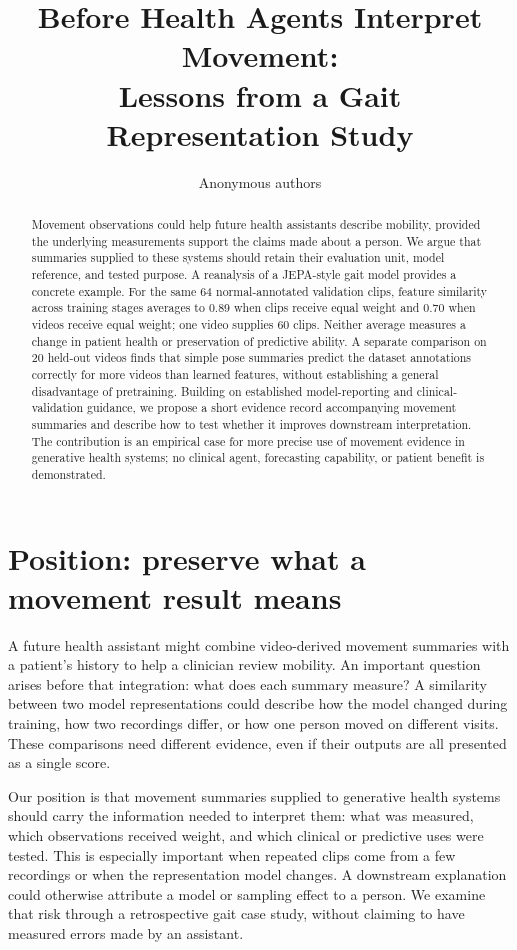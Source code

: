 \documentclass{article}
\title{Before Health Agents Interpret Movement:\\Lessons from a Gait Representation Study}
\author{Anonymous authors}
\begin{document}
\maketitle

\begin{abstract}
Movement observations could help future health assistants describe mobility, provided the underlying measurements support the claims made about a person. We argue that summaries supplied to these systems should retain their evaluation unit, model reference, and tested purpose. A reanalysis of a JEPA-style gait model provides a concrete example. For the same 64 normal-annotated validation clips, feature similarity across training stages averages to 0.89 when clips receive equal weight and 0.70 when videos receive equal weight; one video supplies 60 clips. Neither average measures a change in patient health or preservation of predictive ability. A separate comparison on 20 held-out videos finds that simple pose summaries predict the dataset annotations correctly for more videos than learned features, without establishing a general disadvantage of pretraining. Building on established model-reporting and clinical-validation guidance, we propose a short evidence record accompanying movement summaries and describe how to test whether it improves downstream interpretation. The contribution is an empirical case for more precise use of movement evidence in generative health systems; no clinical agent, forecasting capability, or patient benefit is demonstrated.
\end{abstract}

\section{Position: preserve what a movement result means}

A future health assistant might combine video-derived movement summaries with a patient's history to help a clinician review mobility. An important question arises before that integration: what does each summary measure? A similarity between two model representations could describe how the model changed during training, how two recordings differ, or how one person moved on different visits. These comparisons need different evidence, even if their outputs are all presented as a single score.

Our position is that movement summaries supplied to generative health systems should carry the information needed to interpret them: what was measured, which observations received weight, and which clinical or predictive uses were tested. This is especially important when repeated clips come from a few recordings or when the representation model changes. A downstream explanation could otherwise attribute a model or sampling effect to a person. We examine that risk through a retrospective gait case study, without claiming to have measured errors made by an assistant.
\end{document}
